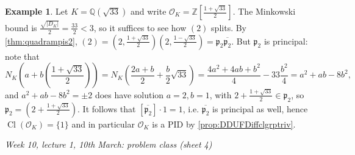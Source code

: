 \documentclass{article}
\newcommand{\Z}{\mathbb{Z}}
\newcommand{\Q}{\mathbb{Q}}
\newcommand{\Cl}{\operatorname{Cl}}
\newcommand{\ri}{\mathcal{O}}
\newcommand{\ip}{\mathfrak{p}}
\theoremstyle{definition}
\newtheorem{example}[defn]{Example}
\begin{document}
\begin{example}
Let $K=\Q\left(\sqrt{33}\right)$ and write $\ri_K=\Z\left[\frac{1+\sqrt{33}}{2}\right]$. The Minkowski bound is $\frac{\sqrt{|D_K|}}{2}=\frac{33}{2}<3$, so it suffices to see how $(2)$ splits. By \ref{thm:quadrampis2}, $(2)=\left(2,\frac{1+\sqrt{33}}{2}\right)\left(2,\frac{1-\sqrt{33}}{2}\right)=\ip_2\overline{\ip_2}$. But $\ip_2$ is principal: note that
\[
N_K\left(a+b\left(\frac{1+\sqrt{33}}{2}\right)\right)=N_K\left(\frac{2a+b}{2}+\frac{b}{2}\sqrt{33}\right)=\frac{4a^2+4ab+b^2}{4}-33\frac{b^2}{4}=a^2+ab-8b^2,
\]
and $a^2+ab-8b^2=\pm 2$ does have solution $a=2,b=1$, with $2+\frac{1+\sqrt{33}}{2}\in\ip_2$, so $\ip_2=\left(2+\frac{1+\sqrt{33}}{2}\right)$. It follows that $[\overline{\ip_2}]\cdot 1=1$, i.e. $\overline{\ip_2}$ is principal as well, hence $\Cl(\ri_K)=\{1\}$ and in particular $\ri_K$ is a PID by \ref{prop:DDUFDiffclgrptriv}.
\end{example}

\begin{flushright}
\textit{Week 10, lecture 1, 10th March: problem class (sheet 4)}
\end{flushright}
\end{document}
